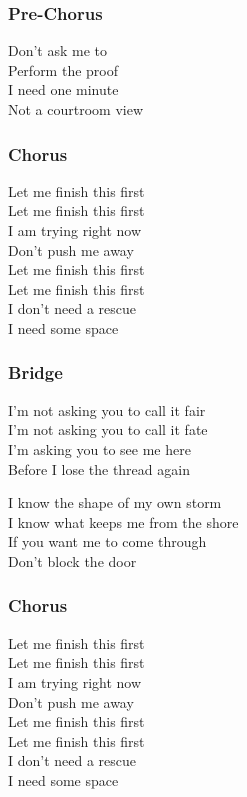 \subsubsection{Pre-Chorus}\label{pre-chorus-1}

Don't ask me to\\
Perform the proof\\
I need one minute\\
Not a courtroom view

\subsubsection{Chorus}\label{chorus-7}

Let me finish this first\\
Let me finish this first\\
I am trying right now\\
Don't push me away\\
Let me finish this first\\
Let me finish this first\\
I don't need a rescue\\
I need some space

\subsubsection{Bridge}\label{bridge-3}

I'm not asking you to call it fair\\
I'm not asking you to call it fate\\
I'm asking you to see me here\\
Before I lose the thread again

I know the shape of my own storm\\
I know what keeps me from the shore\\
If you want me to come through\\
Don't block the door

\subsubsection{Chorus}\label{chorus-8}

Let me finish this first\\
Let me finish this first\\
I am trying right now\\
Don't push me away\\
Let me finish this first\\
Let me finish this first\\
I don't need a rescue\\
I need some space

